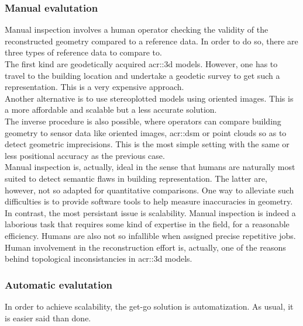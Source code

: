         \subsubsection{Manual evalutation}
            Manual inspection involves a human operator checking the validity of the reconstructed geometry compared to a reference data.
            In order to do so, there are three types of reference data to compare to.\\

            The first kind are geodetically acquired \gls{acr::3d} models.
            However, one has to travel to the building location and undertake a geodetic survey to get such a representation.
            This is a very expensive approach.\\
            Another alternative is to use stereoplotted models using oriented images.
            This is a more affordable and scalable but a less accurate solution.\\
            The inverse procedure is also possible, where operators can compare building geometry to sensor data like oriented images, \gls{acr::dsm} or point clouds so as to detect geometric imprecisions.
            This is the most simple setting with the same or less positional accuracy as the previous case.\\

            Manual inspection is, actually, ideal in the sense that humans are naturally most suited to detect semantic flaws in building representation.
            The latter are, however, not so adapted for quantitative comparisons.
            One way to alleviate such difficulties is to provide software tools to help measure inaccuracies in geometry\addref.\\

            In contrast, the most persistant issue is scalability.
            Manual inspection is indeed a laborious task that requires some kind of expertise in the field, for a reasonable efficiency.
            Humans are also not so infallible when assigned precise repetitive jobs.
            Human involvement in the reconstruction effort is, actually, one of the reasons behind topological inconsistancies in \gls{acr::3d} models.

        \subsubsection{Automatic evalutation}
            In order to achieve scalability, the get-go solution is automatization.
            As usual, it is easier said than done.\\

